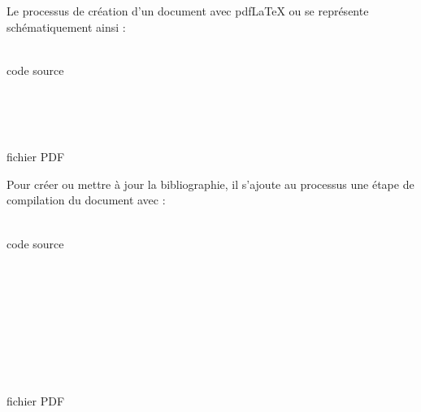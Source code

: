 Le processus de création d'un document avec pdf{\LaTeX} ou {\XeLaTeX}
se représente schématiquement ainsi \citep{UL:latex:1}:
\begin{center}
  \sffamily
  \begin{minipage}[t]{0.12\linewidth}
    \centering
    {\LARGE\faFileTextO} \\ \medskip
    code source
  \end{minipage}
  \quad\faArrowRight\quad
  \begin{minipage}[t]{0.12\linewidth}
    \centering
    {\LARGE\faCogs} \\ \medskip
     \\ 
  \end{minipage}
  \quad\faArrowRight\quad
  \begin{minipage}[t]{0.12\linewidth}
    \centering
    {\LARGE\faFilePdfO} \\ \medskip
    fichier PDF
  \end{minipage}
\end{center}

Pour créer ou mettre à jour la bibliographie, il s'ajoute au processus
une étape de compilation du document avec {\BibTeX}:
\begin{center}
  \sffamily
  \begin{minipage}[t]{0.12\linewidth}
    \centering
    {\LARGE\faFileTextO} \\ \medskip
    code source
  \end{minipage}
  \quad\faArrowRight\quad
  \begin{minipage}[t]{0.12\linewidth}
    \centering
    {\LARGE\faCogs} \\ \medskip
     \\ 
  \end{minipage}
  \quad\faArrowRight\quad
  \begin{minipage}[t]{0.12\linewidth}
    \centering
    {\LARGE\faCogs} \\ \medskip
  \end{minipage}
  \quad\faArrowRight\quad
  \begin{minipage}[t]{0.12\linewidth}
    \centering
    {\LARGE\faCogs}\;
     \\ \medskip
     \\ 
  \end{minipage}
  \quad\faArrowRight\quad
  \begin{minipage}[t]{0.12\linewidth}
    \centering
    {\LARGE\faFilePdfO} \\ \medskip
    fichier PDF
  \end{minipage}
\end{center}

